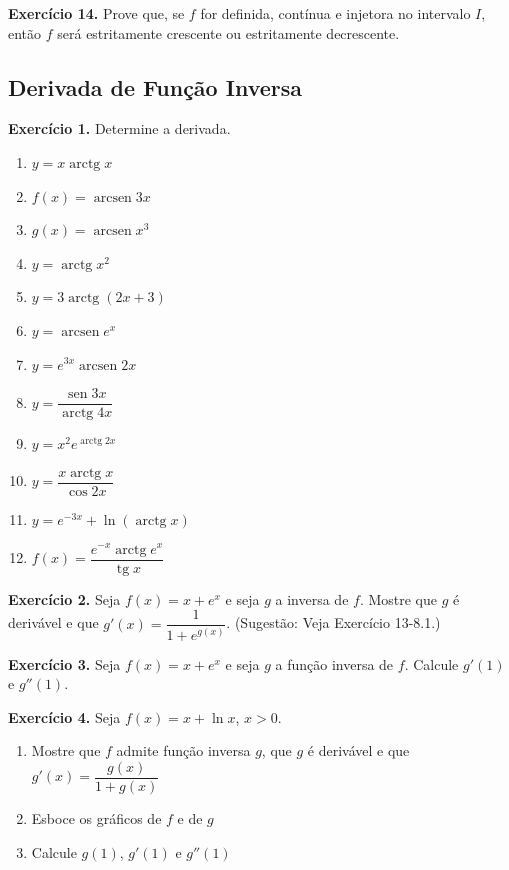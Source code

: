 \documentclass[12pt,a4paper]{article}
\begin{document}
\vspace{0.5cm}
\noindent\textbf{Exercício 14.}
Prove que, se $f$ for definida, contínua e injetora no intervalo $I$, então $f$ será estritamente crescente ou estritamente decrescente.

\subsection{Derivada de Função Inversa}
\vspace{0.5cm}
\noindent\textbf{Exercício 1.} Determine a derivada.
\begin{enumerate}
    \renewcommand{\theenumi}{\alph{enumi}}
    \renewcommand{\labelenumi}{\theenumi)}
    \item $y = x\operatorname{arctg} x$
    \item $f(x) = \operatorname{arcsen} 3x$
    \item $g(x) = \operatorname{arcsen} x^3$
    \item $y = \operatorname{arctg} x^2$
    \item $y = 3\operatorname{arctg}(2x + 3)$
    \item $y = \operatorname{arcsen} e^x$
    \item $y = e^{3x}\operatorname{arcsen} 2x$
    \item $y = \dfrac{\operatorname{sen} 3x}{\operatorname{arctg} 4x}$
    \item $y = x^2 e^{\operatorname{arctg} 2x}$
    \item $y = \dfrac{x\operatorname{arctg} x}{\cos 2x}$
    \item $y = e^{-3x} + \ln(\operatorname{arctg} x)$
    \item $f(x) = \dfrac{e^{-x}\operatorname{arctg} e^x}{\operatorname{tg} x}$
\end{enumerate}

\vspace{0.5cm}
\noindent\textbf{Exercício 2.}
Seja $f(x) = x + e^x$ e seja $g$ a inversa de $f$. Mostre que $g$ é derivável e que $g'(x) = \dfrac{1}{1 + e^{g(x)}}$. (Sugestão: Veja Exercício 13-8.1.)

\vspace{0.5cm}
\noindent\textbf{Exercício 3.}
Seja $f(x) = x + e^x$ e seja $g$ a função inversa de $f$. Calcule $g'(1)$ e $g''(1)$.

\vspace{0.5cm}
\noindent\textbf{Exercício 4.} Seja $f(x) = x + \ln x$, $x > 0$.
\begin{enumerate}
    \renewcommand{\theenumi}{\alph{enumi}}
    \renewcommand{\labelenumi}{\theenumi)}
    \item Mostre que $f$ admite função inversa $g$, que $g$ é derivável e que $g'(x) = \dfrac{g(x)}{1 + g(x)}$
    \item Esboce os gráficos de $f$ e de $g$
    \item Calcule $g(1)$, $g'(1)$ e $g''(1)$
\end{enumerate}
\end{document}
